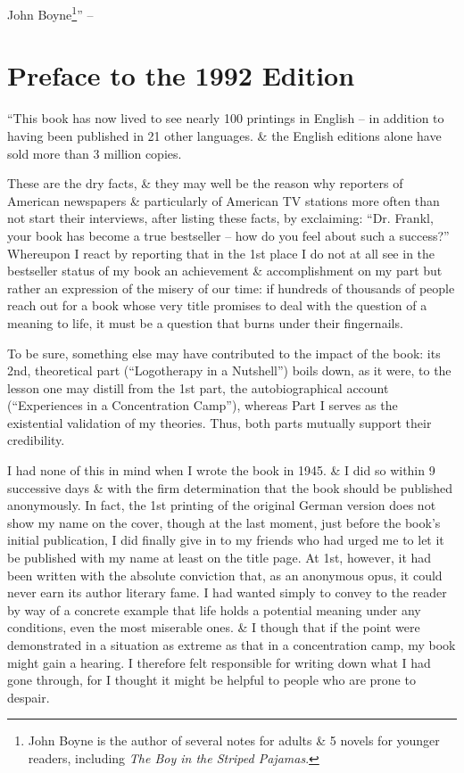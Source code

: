 \documentclass{article}
\numberwithin{equation}{section}
\begin{document}
John Boyne\footnote{John Boyne is the author of several notes for adults \& 5 novels for younger readers, including \textit{The Boy in the Striped Pajamas}.}'' -- \cite[pp. 6--8]{Frankl2017}


\section*{Preface to the 1992 Edition}
``This book has now lived to see nearly 100 printings in English -- in addition to having been published in 21 other languages. \& the English editions alone have sold more than 3 million copies.

These are the dry facts, \& they may well be the reason why reporters of American newspapers \& particularly of American TV stations more often than not start their interviews, after listing these facts, by exclaiming: ``Dr. Frankl, your book has become a true bestseller -- how do you feel about such a success?'' Whereupon I react by reporting that in the 1st place I do not at all see in the bestseller status of my book an achievement \& accomplishment on my part but rather an expression of the misery of our time: if hundreds of thousands of people reach out for a book whose very title promises to deal with the question of a meaning to life, it must be a question that burns under their fingernails.

To be sure, something else may have contributed to the impact of the book: its 2nd, theoretical part (``Logotherapy in a Nutshell'') boils down, as it were, to the lesson one may distill from the 1st part, the autobiographical account (``Experiences in a Concentration Camp''), whereas Part I serves as the existential validation of my theories. Thus, both parts mutually support their credibility.

I had none of this in mind when I wrote the book in 1945. \& I did so within 9 successive days \& with the firm determination that the book should be published anonymously. In fact, the 1st printing of the original German version does not show my name on the cover, though at the last moment, just before the book's initial publication, I did finally give in to my friends who had urged me to let it be published with my name at least on the title page. At 1st, however, it had been written with the absolute conviction that, as an anonymous opus, it could never earn its author literary fame. I had wanted simply to convey to the reader by way of a concrete example that life holds a potential meaning under any conditions, even the most miserable ones. \& I though that if the point were demonstrated in a situation as extreme as that in a concentration camp, my book might gain a hearing. I therefore felt responsible for writing down what I had gone through, for I thought it might be helpful to people who are prone to despair.
\end{document}
